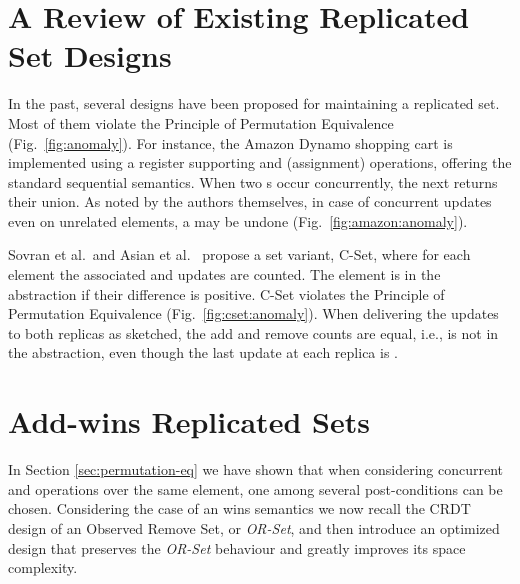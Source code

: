 \documentclass[a4paper]{article}
\begin{document}
\begin{figure*}[tb]
\begin{minipage}{\textwidth}
\caption{Examples of anomalies and a correct design.}
\label{fig:anomaly}
\end{minipage}
\end{figure*}

\section{A Review of Existing Replicated Set Designs}
\label{sec:anomalies}
In the past, several designs have been proposed for maintaining 
a replicated set.
Most of them violate the Principle of Permutation Equivalence
(Fig.~\ref{fig:anomaly}).
For instance, the Amazon Dynamo shopping cart
\cite{app:rep:optim:1606} is implemented using a register
supporting \Read and \Write (assignment) operations, offering the
standard sequential semantics.
When two \Write{}s occur concurrently, the next \Read returns their
union.
As noted by the authors themselves, in case of concurrent updates even
on unrelated elements, a \remove may be undone
(Fig.~\ref{fig:amazon:anomaly}).

Sovran et al.\ and Asian et al.\
\cite{rep:syn:1661,c-set2011} propose a set variant,
{C-Set},
where for each element the associated \add and \remove updates are counted.
The element is in the abstraction if their difference is positive.
C-Set violates the Principle of Permutation Equivalence
(Fig.~\ref{fig:cset:anomaly}).
When delivering the updates to both replicas as sketched, the add and remove counts are equal, i.e.,  is not in the abstraction, even though the last update at each replica is .



\section{Add-wins Replicated Sets}

In Section \ref{sec:permutation-eq} we have shown that when considering
concurrent \add and \remove operations over the same element, one among
several post-conditions can be chosen. Considering the case of an \add wins
semantics we now recall \cite{syn:rep:sh143} 
the CRDT design of an
Observed Remove Set, or \emph{OR-Set}, and then introduce an optimized
design that preserves the \emph{OR-Set} behaviour and greatly improves its
space complexity. 
\end{document}
